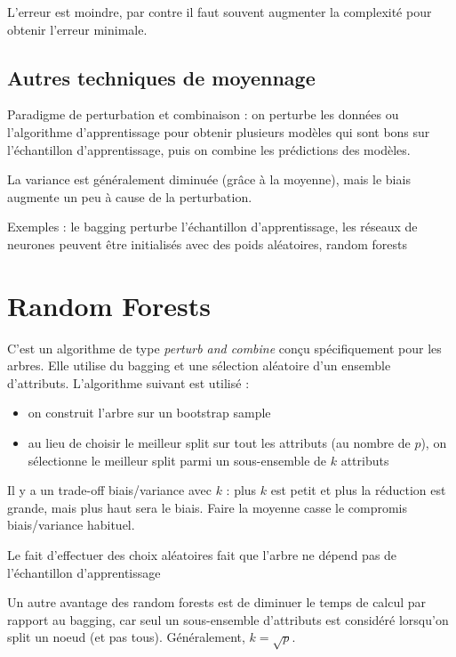 	
	L'erreur est moindre, par contre il faut souvent augmenter la complexité pour obtenir l'erreur minimale.
	
	\subsection{Autres techniques de moyennage}
	
	Paradigme de perturbation et combinaison : on perturbe les données ou l'algorithme d'apprentissage pour obtenir plusieurs modèles qui sont bons sur l'échantillon d'apprentissage, puis on combine les prédictions des modèles.
	
	La variance est généralement diminuée (grâce à la moyenne), mais le biais augmente un peu à cause de la perturbation.
	
	Exemples : le bagging perturbe l'échantillon d'apprentissage, les réseaux de neurones peuvent être initialisés avec des poids aléatoires, random forests
	
\section{Random Forests}

	C'est un algorithme de type \textit{perturb and combine} conçu spécifiquement pour les arbres. Elle utilise du bagging et une sélection aléatoire d'un ensemble d'attributs. L'algorithme suivant est utilisé :
	
	\begin{itemize}
		\item on construit l'arbre sur un bootstrap sample
		\item au lieu de choisir le meilleur split sur tout les attributs (au nombre de $p$), on sélectionne le meilleur split parmi un sous-ensemble de $k$ attributs
	\end{itemize}
	
	Il y a un trade-off biais/variance avec $k$ : plus $k$ est petit et plus la réduction est grande, mais plus haut sera le biais. Faire la moyenne casse le compromis biais/variance habituel.
	
	Le fait d'effectuer des choix aléatoires fait que l'arbre ne dépend pas de l'échantillon d'apprentissage
	
	
	Un autre avantage des random forests est de diminuer le temps de calcul par rapport au bagging, car seul un sous-ensemble d'attributs est considéré lorsqu'on split un noeud (et pas tous). Généralement, $k = \sqrt{p}$.
	
